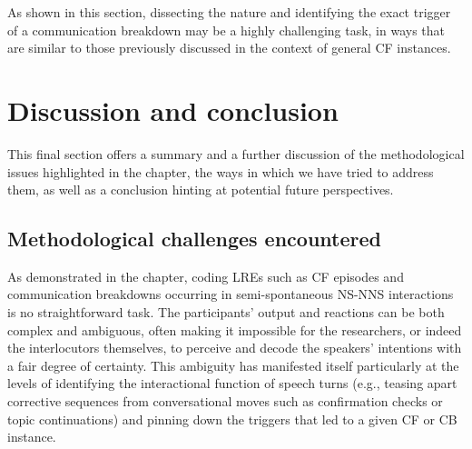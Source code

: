 \documentclass[output=paper,colorlinks,citecolor=brown,modfonts,nonflat]{../langscibook}
\begin{document}
As shown in this section, dissecting the nature and identifying the exact trigger of a communication breakdown may be a highly challenging task, in ways that are similar to those previously discussed in the context of general CF instances.

\section{Discussion and conclusion}\label{sec:scheuer:6}

This final section offers a summary and a further discussion of the methodological issues highlighted in the chapter, the ways in which we have tried to address them, as well as a conclusion hinting at potential future perspectives. 

\subsection{Methodological challenges encountered}\label{sec:scheuer:6.1}

As demonstrated in the chapter, coding LREs such as CF episodes and communication breakdowns occurring in semi-spontaneous NS-NNS interactions is no straightforward task. The participants’ output and reactions can be both complex and ambiguous, often making it impossible for the researchers, or indeed the interlocutors themselves, to perceive and decode the speakers’ intentions with a fair degree of certainty. This ambiguity has manifested itself particularly at the levels of identifying the interactional function of speech turns (e.g., teasing apart corrective sequences from conversational moves such as confirmation checks or topic continuations) and pinning down the triggers that led to a given CF or CB instance. 
\end{document}
